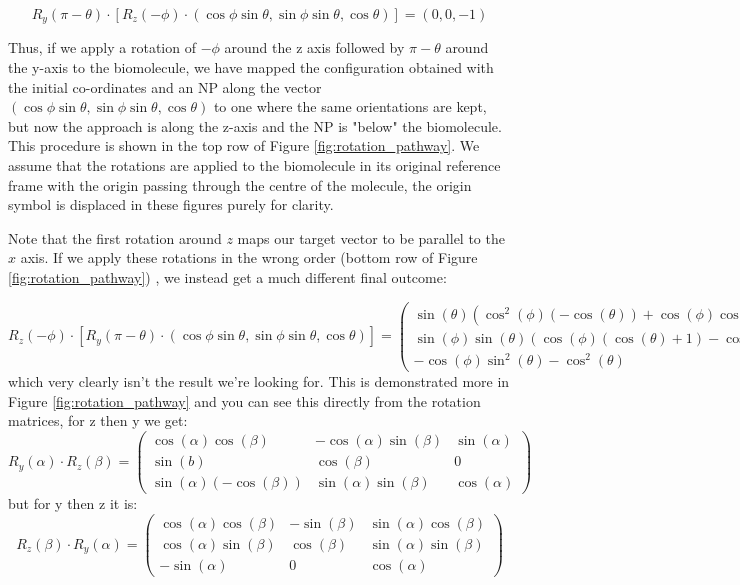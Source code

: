 \documentclass[10pt,a4paper,onecolumn]{report}
\begin{document}
\begin{equation}
 R_y(\pi - \theta) \cdot \left[ R_z(-\phi) \cdot ( \cos \phi \sin \theta,  \sin \phi \sin \theta,  \cos \theta) \right] =  (0,0,-1)
\end{equation}

Thus, if we apply a rotation of $-\phi$ around the z axis followed by $\pi - \theta$ around the y-axis to the biomolecule, we have mapped the configuration obtained with the initial co-ordinates and an NP along the vector $( \cos \phi \sin \theta,  \sin \phi \sin \theta,  \cos \theta)$ to one where the same orientations are kept, but now the approach is along the z-axis and the NP is "below" the biomolecule. This procedure is shown in the top row of Figure   \ref{fig:rotation_pathway}. We assume that the rotations are applied to the biomolecule in its original reference frame with the origin passing through the centre of the molecule, the origin symbol is displaced in these figures purely for clarity. 

 Note that the first rotation around $z$ maps our target vector to be parallel to the $x$ axis. If we apply these rotations in the wrong order (bottom row of Figure \ref{fig:rotation_pathway}) , we instead get a much different final outcome:


\begin{equation}
 R_z(-\phi) \cdot \left[ R_y(\pi-\theta) \cdot ( \cos \phi \sin \theta,  \sin \phi \sin \theta,  \cos \theta) \right] =  
\begin{pmatrix} 
    \sin (\theta ) \left(\cos ^2(\phi ) (-\cos (\theta ))+\cos (\phi )
   \cos (\theta )+\sin ^2(\phi )\right)
   \\
   \sin (\phi ) \sin (\theta ) (\cos
   (\phi ) (\cos (\theta )+1)-\cos (\theta ))
   \\
   -\cos (\phi ) \sin ^2(\theta
   )-\cos ^2(\theta ) 
   \end{pmatrix}
\end{equation}
which very clearly isn't the result we're looking for. This is demonstrated more in Figure \ref{fig:rotation_pathway} and you can see this directly from the rotation matrices, for z then y we get:
\begin{equation}
R_y(\alpha) \cdot R_z(\beta) = 
\begin{pmatrix}
 \cos (\alpha) \cos (\beta) & -\cos (\alpha) \sin (\beta) & \sin (\alpha) \\
 \sin (b) & \cos (\beta) & 0 \\
 \sin (\alpha) (-\cos (\beta)) & \sin (\alpha) \sin (\beta) & \cos (\alpha)
\end{pmatrix}
\end{equation}
but for y then z it is:
\begin{equation}
R_z(\beta) \cdot R_y(\alpha) = 
\begin{pmatrix}
 \cos (\alpha) \cos (\beta) & -\sin (\beta) & \sin (\alpha) \cos (\beta) \\
 \cos (\alpha) \sin (\beta) & \cos (\beta) & \sin (\alpha) \sin (\beta) \\
 -\sin (\alpha) & 0 & \cos (\alpha)
\end{pmatrix}
\end{equation}
\end{document}
